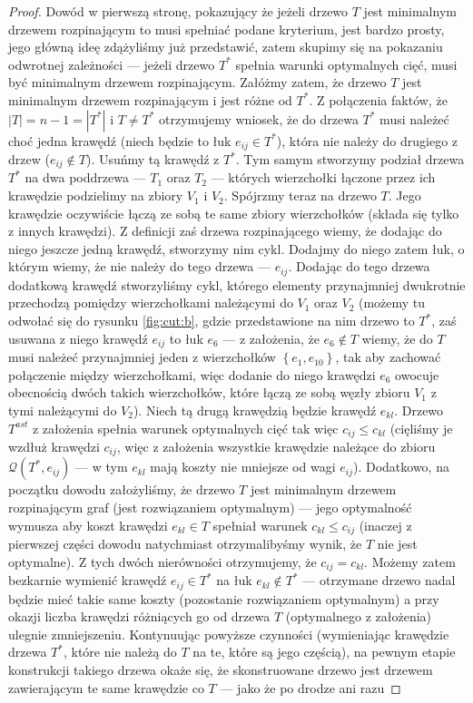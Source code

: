 \begin{proof}
	Dowód w pierwszą stronę, pokazujący że jeżeli drzewo $T$ jest minimalnym drzewem rozpinającym to musi spełniać podane kryterium, jest bardzo prosty, jego główną ideę zdążyliśmy już przedstawić, zatem skupimy się na pokazaniu odwrotnej zależności --- jeżeli drzewo $T^{\ast}$ spełnia warunki optymalnych cięć, musi być minimalnym drzewem rozpinającym. Załóżmy zatem, że drzewo $T$ jest minimalnym drzewem rozpinającym i jest różne od $T^{\ast}$. Z połączenia faktów, że $\left| T \right| = n - 1 = \left| T^{\ast} \right|$ i $T \neq T^{\ast}$ otrzymujemy wniosek, że do drzewa $T^{\ast}$ musi należeć choć jedna krawędź (niech będzie to łuk $e_{ij} \in T^{\ast}$), która nie należy do drugiego z drzew ($e_{ij} \notin T$). Usuńmy tą krawędź z $T^{\ast}$. Tym samym stworzymy podział drzewa $T^{\ast}$ na dwa poddrzewa --- $T_{1}$ oraz $T_{2}$ --- których wierzchołki łączone przez ich krawędzie podzielimy na zbiory $V_{1}$ i $V_{2}$. Spójrzmy teraz na drzewo $T$. Jego krawędzie oczywiście łączą ze sobą te same zbiory wierzchołków (składa się tylko z innych krawędzi). Z definicji zaś drzewa rozpinającego wiemy, że dodając do niego jeszcze jedną krawędź, stworzymy nim cykl. Dodajmy do niego zatem łuk, o którym wiemy, że nie należy do tego drzewa --- $e_{ij}$. Dodając do tego drzewa dodatkową krawędź stworzyliśmy cykl, którego elementy przynajmniej dwukrotnie przechodzą pomiędzy wierzchołkami należącymi do $V_{1}$ oraz $V_{2}$ (możemy tu odwołać się do rysunku \ref{fig:cut:b}, gdzie przedstawione na nim drzewo to $T^{\ast}$, zaś usuwana z niego krawędź $e_{ij}$ to łuk $e_{6}$ --- z założenia, że $e_{6} \notin T$ wiemy, że do $T$ musi należeć przynajmniej jeden z wierzchołków $\left\{ e_{1}, e_{10} \right\}$, tak aby zachować połączenie między wierzchołkami, więc dodanie do niego krawędzi $e_{6}$ owocuje obecnością dwóch takich wierzchołków, które łączą ze sobą węzły zbioru $V_{1}$ z tymi należącymi do $V_{2}$). Niech tą drugą krawędzią będzie krawędź $e_{kl}$. Drzewo $T^{ast}$ z założenia spełnia warunek optymalnych cięć tak więc $c_{ij} \leqslant c_{kl}$ (cięliśmy je wzdłuż krawędzi $c_{ij}$, więc z założenia wszystkie krawędzie należące do zbioru $\mathcal{Q} \left( T^{\ast}, e_{ij} \right)$ --- w tym $e_{kl}$ mają koszty nie mniejsze od wagi $e_{ij}$). Dodatkowo, na początku dowodu założyliśmy, że drzewo $T$ jest minimalnym drzewem rozpinającym graf (jest rozwiązaniem optymalnym) --- jego optymalność wymusza aby koszt krawędzi $e_{kl} \in T$ spełniał warunek $c_{kl} \leqslant c_{ij}$ (inaczej z pierwszej części dowodu natychmiast otrzymalibyśmy wynik, że $T$ nie jest optymalne). Z tych dwóch nierówności otrzymujemy, że $c_{ij} = c_{kl}$. Możemy zatem bezkarnie wymienić krawędź $e_{ij} \in T^{\ast}$ na łuk $e_{kl} \notin T^{\ast}$ --- otrzymane drzewo nadal będzie mieć takie same koszty (pozostanie rozwiązaniem optymalnym) a przy okazji liczba krawędzi różniących go od drzewa $T$ (optymalnego z założenia) ulegnie zmniejszeniu. Kontynuując powyższe czynności (wymieniając krawędzie drzewa $T^{\ast}$, które nie należą do $T$ na te, które są jego częścią), na pewnym etapie konstrukcji takiego drzewa okaże się, że skonstruowane drzewo jest drzewem zawierającym te same krawędzie co $T$ --- jako że po drodze ani razu 
\end{proof}
